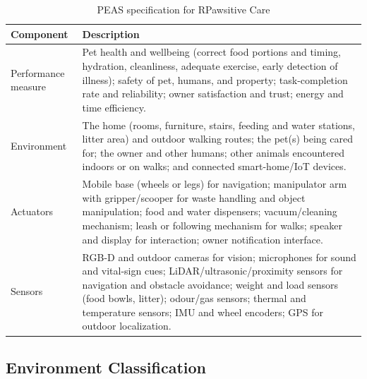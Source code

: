 \documentclass[conference,letterpaper]{IEEEtran}
\begin{document}
\begin{table}[!htbp]\caption{PEAS specification for RPawsitive Care}\label{tab:peas}\centering\footnotesize\renewcommand{\arraystretch}{1.15}\begin{tabularx}{\columnwidth}{@{}p{}X@{}}\toprule Component & Description \\\midrule
Performance measure & Pet health and wellbeing (correct food portions and timing, hydration, cleanliness, adequate exercise, early detection of illness); safety of pet, humans, and property; task-completion rate and reliability; owner satisfaction and trust; energy and time efficiency. \\
Environment & The home (rooms, furniture, stairs, feeding and water stations, litter area) and outdoor walking routes; the pet(s) being cared for; the owner and other humans; other animals encountered indoors or on walks; and connected smart-home/IoT devices. \\
Actuators & Mobile base (wheels or legs) for navigation; manipulator arm with gripper/scooper for waste handling and object manipulation; food and water dispensers; vacuum/cleaning mechanism; leash or following mechanism for walks; speaker and display for interaction; owner notification interface. \\
Sensors & RGB-D and outdoor cameras for vision; microphones for sound and vital-sign cues; LiDAR/ultrasonic/proximity sensors for navigation and obstacle avoidance; weight and load sensors (food bowls, litter); odour/gas sensors; thermal and temperature sensors; IMU and wheel encoders; GPS for outdoor localization. \\
\bottomrule\end{tabularx}\end{table}

\subsection{Environment Classification}
\end{document}
